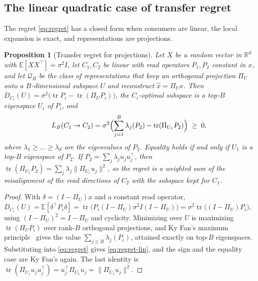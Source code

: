 \documentclass[11pt]{article}
\newtheorem{proposition}{Proposition}
\theoremstyle{definition}
\theoremstyle{remark}
\newcommand{\E}{\mathbb{E}}
\newcommand{\R}{\mathbb{R}}
\newcommand{\tr}{\operatorname{tr}}
\begin{document}
\subsection{The linear quadratic case of transfer regret}

The regret \eqref{eq:regret} has a closed form when consumers are linear, the local expansion is exact, and representations are projections.

\begin{proposition}[Transfer regret for projections]
\label{prop:regret}
Let $X$ be a random vector in $\R^{d}$ with $\E[XX^{\top}]=\sigma^{2}I$, let $C_{1},C_{2}$ be linear with read operators $P_{1},P_{2}$ constant in $x$, and let $\mathcal{Q}_{B}$ be the class of representations that keep an orthogonal projection $\Pi_{U}$ onto a $B$-dimensional subspace $U$ and reconstruct $\hat{x}=\Pi_{U}x$. Then $D_{C_{i}}(U)=\sigma^{2}\bigl(\tr P_{i}-\tr(\Pi_{U}P_{i})\bigr)$, the $C_{i}$-optimal subspace is a top-$B$ eigenspace $U_{i}$ of $P_{i}$, and
\begin{equation}
L_{B}(C_{1}\to C_{2})=\sigma^{2}\Bigl(\sum_{j=1}^{B}\lambda_{j}(P_{2})-\tr(\Pi_{U_{1}}P_{2})\Bigr)\;\ge\;0,
\label{eq:regret-lin}
\end{equation}
where $\lambda_{1}\ge\dots\ge\lambda_{d}$ are the eigenvalues of $P_{2}$. Equality holds if and only if $U_{1}$ is a top-$B$ eigenspace of $P_{2}$. If $P_{2}=\sum_{j}\lambda_{j}u_{j}u_{j}^{\top}$, then $\tr(\Pi_{U_{1}}P_{2})=\sum_{j}\lambda_{j}\|\Pi_{U_{1}}u_{j}\|^{2}$, so the regret is a weighted sum of the misalignment of the read directions of $C_{2}$ with the subspace kept for $C_{1}$.
\end{proposition}

\begin{proof}
With $\delta=(I-\Pi_{U})x$ and a constant read operator, $D_{C_{i}}(U)=\E[\delta^{\top}P_{i}\delta]=\tr\bigl(P_{i}(I-\Pi_{U})\sigma^{2}I(I-\Pi_{U})\bigr)=\sigma^{2}\tr\bigl((I-\Pi_{U})P_{i}\bigr)$, using $(I-\Pi_{U})^{2}=I-\Pi_{U}$ and cyclicity.
Minimizing over $U$ is maximizing $\tr(\Pi_{U}P_{i})$ over rank-$B$ orthogonal projections, and Ky Fan's maximum principle~\cite{fan1949} gives the value $\sum_{j\le B}\lambda_{j}(P_{i})$, attained exactly on top-$B$ eigenspaces.
Substituting into \eqref{eq:regret} gives \eqref{eq:regret-lin}, and the sign and the equality case are Ky Fan's again.
The last identity is $\tr(\Pi_{U_{1}}u_{j}u_{j}^{\top})=u_{j}^{\top}\Pi_{U_{1}}u_{j}=\|\Pi_{U_{1}}u_{j}\|^{2}$.
\end{proof}
\end{document}
